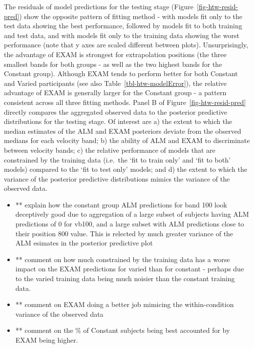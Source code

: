 \documentclass[
  letterpaper,
  DIV=11,
  numbers=noendperiod,
  oneside]{scrartcl}
\begin{document}
The residuals of model predictions for the testing stage
(Figure~\ref{fig-htw-resid-pred}) show the opposite pattern of fitting
method - with models fit only to the test data showing the best
performance, followed by models fit to both training and test data, and
with models fit only to the training data showing the worst performance
(note that y axes are scaled different between plots). Unsurprisingly,
the advantage of EXAM is strongest for extrapolation positions (the
three smallest bands for both groups - as well as the two highest bands
for the Constant group). Although EXAM tends to perform better for both
Constant and Varied participants (see also
Table~\ref{tbl-htw-modelError}), the relative advantage of EXAM is
generally larger for the Constant group - a pattern consistent across
all three fitting methods. Panel B of Figure~\ref{fig-htw-resid-pred}
directly compares the aggregated observed data to the posterior
predictive distributions for the testing stage. Of interest are a) the
extent to which the median estimates of the ALM and EXAM posteriors
deviate from the observed medians for each velocity band; b) the ability
of ALM and EXAM to discriminate between velocity bands; c) the relative
performance of models that are constrained by the training data
(i.e.~the `fit to train only' and `fit to both' models) compared to the
`fit to test only' models; and d) the extent to which the variance of
the posterior predictive distributions mimics the variance of the
observed data.

\begin{itemize}
\item
  ** explain how the constant group ALM predictions for band 100 look
  deceptively good due to aggregation of a large subset of subjects
  having ALM predictions of 0 for vb100, and a large subset with ALM
  predictions close to their position 800 value. This is relected by
  much greater variance of the ALM esimates in the posterior predictive
  plot
\item
  ** comment on how much constrained by the training data has a worse
  impact on the EXAM predictions for varied than for constant - perhaps
  due to the varied training data being much noisier than the constant
  training data.
\item
  ** comment on EXAM doing a better job mimicing the within-condition
  variance of the observed data
\item
  ** comment on the \% of Constant subjects being best accounted for by
  EXAM being higher.
\end{itemize}
\end{document}
